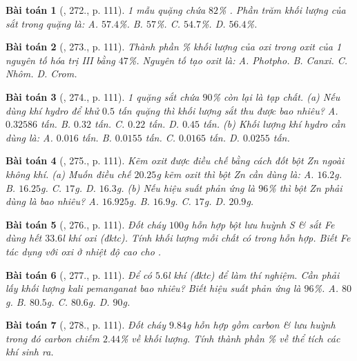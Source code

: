 \documentclass{article}
\newtheorem{baitoan}{Bài toán}
\begin{document}
\begin{baitoan}[\cite{An_400_BT_Hoa_Hoc_8_2020}, 272., p. 111]
	1 mẫu quặng chứa $82$\% \emph{}. Phần trăm khối lượng của sắt trong quặng là: {\sf A.} $57.4$\%. {\sf B.} $57$\%. {\sf C.} $54.7$\%. {\sf D.} $56.4$\%.
\end{baitoan}

\begin{baitoan}[\cite{An_400_BT_Hoa_Hoc_8_2020}, 273., p. 111]
	Thành phần \% khối lượng của oxi trong oxit của 1 nguyên tố hóa trị III bằng $47$\%. Nguyên tố tạo oxit là: {\sf A.} Photpho. {\sf B.} Canxi. {\sf C.} Nhôm. {\sf D.} Crom.
\end{baitoan}

\begin{baitoan}[\cite{An_400_BT_Hoa_Hoc_8_2020}, 274., p. 111]
	1 quặng sắt chứa $90$\% \emph{} còn lại là tạp chất. (a) Nếu dùng khí hydro để khử $0.5$ tấn quặng thì khối lượng sắt thu được bao nhiêu? {\sf A.} $0.32586$ tấn. {\sf B.} $0.32$ tấn. {\sf C.} $0.22$ tấn. {\sf D.} $0.45$ tấn. (b) Khối lượng khí hydro cần dùng là:  {\sf A.} $0.016$ tấn. {\sf B.} $0.0155$ tấn. {\sf C.} $0.0165$ tấn. {\sf D.} $0.0255$ tấn.
\end{baitoan}

\begin{baitoan}[\cite{An_400_BT_Hoa_Hoc_8_2020}, 275., p. 111]
	Kẽm oxit được điều chế bằng cách đốt bột \emph{Zn} ngoài không khí. (a) Muốn điều chế $20.25$\emph{g} kẽm oxit thì bột \emph{Zn} cần dùng là: {\sf A.} $16.2$\emph{g}. {\sf B.} $16.25$\emph{g}. {\sf C.} $17$\emph{g}. {\sf D.} $16.3$\emph{g}. (b) Nếu hiệu suất phản ứng là $96$\% thì bột \emph{Zn} phải dùng là bao nhiêu? {\sf A.} $16.925$\emph{g}. {\sf B.} $16.9$\emph{g}. {\sf C.} $17$\emph{g}. {\sf D.} $20.9$\emph{g}.
\end{baitoan}

\begin{baitoan}[\cite{An_400_BT_Hoa_Hoc_8_2020}, 276., p. 111]
	Đốt cháy $100$\emph{g} hỗn hợp bột lưu huỳnh \emph{S} \& sắt \emph{Fe} dùng hết $33.6$\emph{l} khí oxi (đktc). Tính khối lượng mỗi chất có trong hỗn hợp. Biết \emph{Fe} tác dụng với oxi ở nhiệt độ cao cho \emph{}.
\end{baitoan}

\begin{baitoan}[\cite{An_400_BT_Hoa_Hoc_8_2020}, 277., p. 111]
	Để có $5.6$\emph{l} khí \emph{} (đktc) để làm thí nghiệm. Cần phải lấy khối lượng kali pemanganat \emph{} bao nhiêu? Biết hiệu suất phản ứng là $96$\%. {\sf A.} $80$\emph{g}. {\sf B.} $80.5$\emph{g}. {\sf C.} $80.6$\emph{g}. {\sf D.} $90$\emph{g}.
\end{baitoan}

\begin{baitoan}[\cite{An_400_BT_Hoa_Hoc_8_2020}, 278., p. 111]
	Đốt cháy $9.84$\emph{g} hỗn hợp gồm carbon \& lưu huỳnh trong đó carbon chiếm $2.44$\% về khối lượng. Tính thành phần \% về thể tích các khí sinh ra.
\end{baitoan}


\printbibliography[heading=bibintoc]
	
\end{document}
